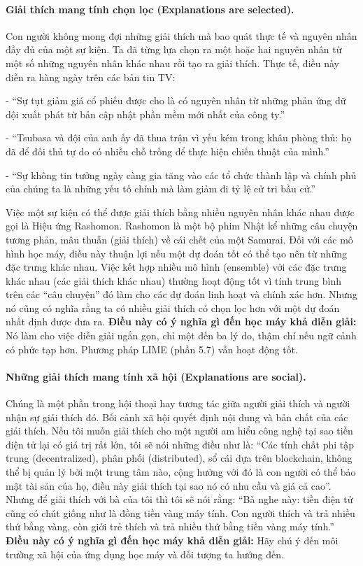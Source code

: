 \paragraph{Giải thích mang tính chọn lọc (Explanations are selected).} Con người không mong đợi những giải thích mà bao quát thực tế và nguyên nhân đầy đủ của một sự kiện. Ta đã từng lựa chọn ra một hoặc hai nguyên nhân từ một số những nguyên nhân khác nhau rồi tạo ra giải thích. Thực tế, điều này diễn ra hàng ngày trên các bản tin TV: 

- ``Sự tụt giảm giá cổ phiếu được cho là có nguyên nhân từ những phản ứng dữ dội xuất phát từ bản cập nhật phần mềm mới nhất của công ty.''

- ``Tsubasa và đội của anh ấy đã thua trận vì yếu kém trong khâu phòng thủ: họ đã để đối thủ tự do có nhiều chỗ trống để thực hiện chiến thuật của mình.''

- ``Sự không tin tưởng ngày càng gia tăng vào các tổ chức thành lập và chính phủ của chúng ta là những yếu tố chính mà làm giảm đi tỷ lệ cử tri bầu cử.''

Việc một sự kiện có thể được giải thích bằng nhiều nguyên nhân khác nhau được gọi là Hiệu ứng Rashomon.  Rashomon là một bộ phim Nhật kể những câu chuyện tương phản, mâu thuẫn (giải thích) về cái chết của một Samurai. Đối với các mô hình học máy, điều này thuận lợi nếu một dự đoán tốt có thể tạo nên từ những đặc trưng khác nhau. Việc kết hợp nhiều mô hình (ensemble) với các đặc trưng khác nhau (các giải thích khác nhau) thường hoạt động tốt vì tính trung bình trên các ``câu chuyện'' đó làm cho các dự đoán linh hoạt và chính xác hơn. Nhưng nó cũng có nghĩa rằng ta có nhiều giải thích có chọn lọc hơn với một dự đoán nhất định được đưa ra.
\textbf{Điều này có ý nghĩa gì đến học máy khả diễn giải:} Nó làm cho việc diễn giải ngắn gọn, chỉ một đến ba lý do, thậm chí nếu ngữ cảnh có phức tạp hơn. Phương pháp LIME (phần 5.7) vẫn hoạt động tốt.

\paragraph{Những giải thích mang tính xã hội (Explanations are social).} Chúng là một phần trong hội thoại hay tương tác giữa người giải thích và người nhận sự giải thích đó. Bối cảnh xã hội quyết định nội dung và bản chất của các giải thích. Nếu tôi muốn giải thích cho một người am hiểu công nghệ tại sao tiền điện tử lại có giá trị rất lớn, tôi sẽ nói những điều như là: ``Các tính chất phi tập trung (decentralized), phân phối (distributed), sổ cái dựa trên blockchain, không thể bị quản lý bởi một trung tâm nào, cộng hưởng với đó là con người có thể bảo mật tài sản của họ, điều này giải thích tại sao nó có nhu cầu và giá cả cao''. Nhưng để giải thích với bà của tôi thì tôi sẽ nói rằng: ``Bà nghe này: tiền điện tử cũng có chút giống như là đồng tiền vàng máy tính. Con người thích và trả nhiều thứ bằng vàng, còn giới trẻ thích và trả nhiều thứ bằng tiền vàng máy tính.''
\textbf{Điều này có ý nghĩa gì đến học máy khả diễn giải:} Hãy chú ý đến môi trường xã hội của ứng dụng học máy  và đối tượng ta hướng đến.

